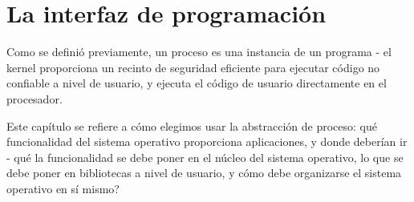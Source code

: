 \documentclass[10pt]{book}
\begin{document}
\chapter{La interfaz de programación}
Como se definió previamente, un proceso es una instancia de un programa - el kernel proporciona un recinto de seguridad eficiente para ejecutar código no confiable a nivel de usuario, y ejecuta el código de usuario directamente en el procesador.

Este capítulo se refiere a cómo elegimos usar la abstracción de proceso: qué funcionalidad del sistema operativo proporciona aplicaciones, y donde deberían ir - qué la funcionalidad se debe poner en el núcleo del sistema operativo, lo que se debe poner en bibliotecas a nivel de usuario, y cómo debe organizarse el sistema operativo en sí mismo?
\end{document}
